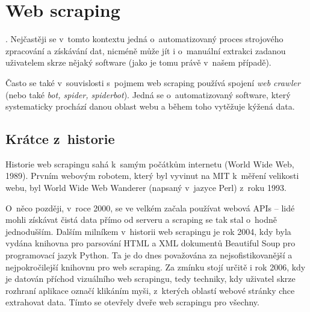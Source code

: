 \documentclass[thesis=B,czech]{FITthesis}[2012/06/26]
\begin{document}

\section{Web scraping}
\cite[překlad autora]{web_scraping_def}. Nejčastěji se v~tomto kontextu jedná o~automatizovaný proces strojového zpracování a získávání dat, nicméně může jít i o~manuální extrakci zadanou uživatelem skrze nějaký software (jako je tomu právě v~našem případě).

Často se také v~souvislosti s~pojmem web scraping používá spojení \emph{web crawler} (nebo také \emph{bot, spider, spiderbot}). Jedná se o~automatizovaný software, který systematicky prochází danou oblast webu a během toho vytěžuje kýžená data.\cite{web_crawler_def}

\subsection{Krátce z~historie}
Historie web scrapingu sahá k~samým počátkům internetu (World Wide Web, 1989). Prvním webovým robotem, který byl vyvinut na MIT k~měření velikosti webu, byl World Wide Web Wanderer (napsaný v~jazyce Perl) z~roku 1993.\cite{web_wanderer}

O~něco později, v~roce 2000, se ve velkém začala používat webová APIs -- lidé mohli získávat čistá data přímo od serveru a scraping se tak stal o~hodně jednodušším. Dalším milníkem v~historii web scrapingu je rok 2004, kdy byla vydána knihovna pro parsování HTML a XML dokumentů Beautiful Soup pro programovací jazyk Python. Ta je do dnes považována za nejsofistikovanější a nejpokročilejší knihovnu pro web scraping. Za zmínku stojí určitě i rok 2006, kdy je datován příchod vizuálního web scrapingu, tedy techniky, kdy uživatel skrze rozhraní aplikace označí klikáním myši, z~kterých oblastí webové stránky chce extrahovat data. Tímto se otevřely dveře web scrapingu pro všechny.\cite{web_scraping_history}
\end{document}
